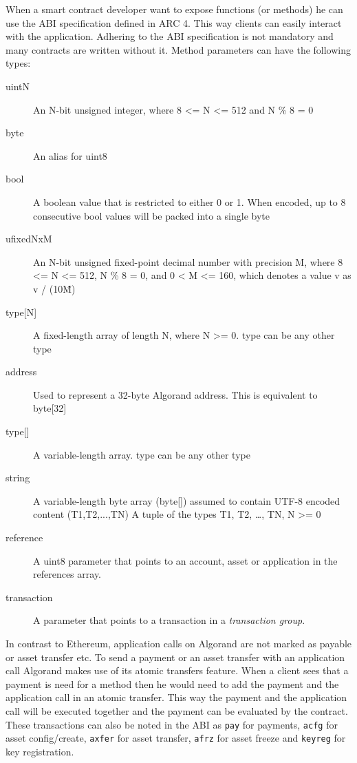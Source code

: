 When a smart contract developer want to expose functions (or methods) he can use the \ac{ABI} specification defined in \ac{ARC} 4. This way clients can easily interact with the application. Adhering to the \ac{ABI} specification is not mandatory and many contracts are written without it. Method parameters can have the following types:
\begin{description}
    \item[uintN] An N-bit unsigned integer, where 8 <= N <= 512 and N \% 8 = 0
    \item[byte]	An alias for uint8
    \item[bool]	A boolean value that is restricted to either 0 or 1. When encoded, up to 8 consecutive bool values will be packed into a single byte
    \item[ufixedNxM] An N-bit unsigned fixed-point decimal number with precision M, where 8 <= N <= 512, N \% 8 = 0, and 0 < M <= 160, which denotes a value v as v / (10\^M)

        \item[{type[N]}] A fixed-length array of length N, where N >= 0. type can be any other type
    \item[address] Used to represent a 32-byte Algorand address. This is equivalent to byte[32]

        \item[{type[]}] A variable-length array. type can be any other type
    \item[string] A variable-length byte array (byte[]) assumed to contain UTF-8 encoded content
        (T1,T2,...,TN) A tuple of the types T1, T2, …, TN, N >= 0
    \item[reference] A uint8 parameter that points to an account, asset or application in the references array.
    \item[transaction] A parameter that points to a transaction in a \textit{transaction group}.
\end{description}

In contrast to Ethereum, application calls on Algorand are not marked as payable or asset transfer etc. To send a payment or an asset transfer with an application call Algorand makes use of its atomic transfers feature. When a client sees that a payment is need for a method then he would need to add the payment and the application call in an atomic transfer. This way the payment and the application call will be executed together and the payment can be evaluated by the contract. These transactions can also be noted in the \ac{ABI} as \texttt{pay} for payments, \texttt{acfg} for asset config/create, \texttt{axfer} for asset transfer, \texttt{afrz} for asset freeze and \texttt{keyreg} for key registration.


